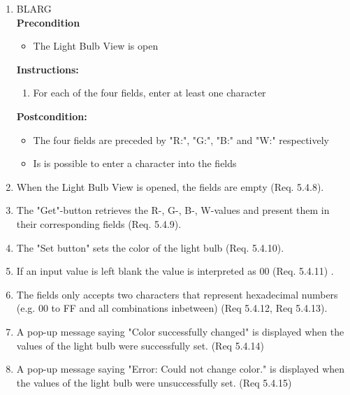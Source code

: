 \documentclass[a4paper]{article}
\newlength{\testlabellength}
\newenvironment{testlist}{\begin{enumerate}[label=\bfseries Instruction \thesubsection.\arabic* , labelindent=0pt, labelwidth=\testlabellength , leftmargin=2cm]}{\end{enumerate}}
\newenvironment{precondition}{
{\color{white}BLARG}\\ 
\textbf{Precondition}
\begin{itemize}[labelindent=0cm, labelwidth=2cm , leftmargin=1cm]
}
{\end{itemize}}
\newenvironment{instruction}{
\textbf{Instructions:}
\begin{enumerate}[label=\bfseries  \arabic*., labelindent=0cm, labelwidth=2cm , leftmargin=1cm]
}
{\end{enumerate}}
\newenvironment{postcondition}{
\textbf{Postcondition:}
\begin{itemize}[labelindent=0cm, labelwidth=2cm , leftmargin=1cm]
}
{\end{itemize}}
\begin{document}
\begin{appendices}
\begin{testlist}
  
    
   	\item 	\begin{precondition}
   				\item The Light Bulb View is open
			\end{precondition}
    		\begin{instruction}
    			\item For each of the four fields, enter at least one character
    		\end{instruction}
    		\begin{postcondition}
    			\item The four fields are preceded by "R:", "G:", "B:" and "W:" respectively
    			\item Is is possible to enter a character into the fields
    		\end{postcondition}

    
	\item When the Light Bulb View is opened, the fields are empty (Req. 5.4.8).

	\item The "Get"-button retrieves the R-, G-, B-, W-values and present them in their corresponding fields (Req. 5.4.9). 

	\item The "Set button" sets the color of the light bulb (Req. 5.4.10).

	\item If an input value is left blank the value is interpreted as 00 (Req. 5.4.11) .   
    
    \item The fields only accepts two characters that represent hexadecimal numbers (e.g. 00 to FF and all combinations inbetween) (Req 5.4.12, Req 5.4.13).
    
    \item A pop-up message saying "Color successfully changed" is displayed when the values of the light bulb were successfully set. (Req 5.4.14)
    
    \item A pop-up message saying "Error: Could not change color." is displayed when the values of the light bulb were unsuccessfully set. (Req 5.4.15)
       

\end{testlist}
\end{appendices}
\end{document}
